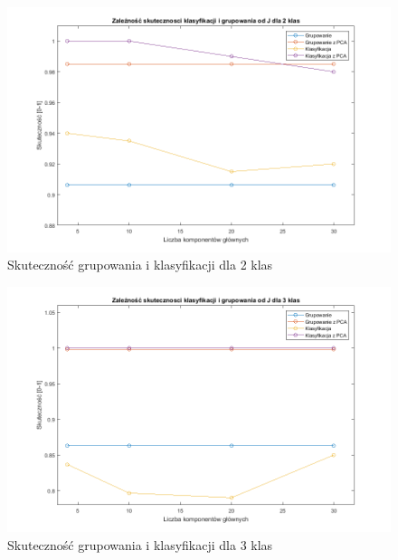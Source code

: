 \begin{figure}[H]
	\centering
	\hspace*{-0.8in}
	\includegraphics[scale = 0.7]{img/acc_from_J_2classes.png}
	\caption{Skuteczność grupowania i klasyfikacji dla 2 klas}  
	\label{rys:acc_from_J_2classes} 
\end{figure}

\begin{figure}[H]
	\centering
	\hspace*{-0.8in}
	\includegraphics[scale = 0.7]{img/acc_from_J_3classes.png}
	\caption{Skuteczność grupowania i klasyfikacji dla 3 klas}  
	\label{rys:acc_from_J_3classes} 
\end{figure}

